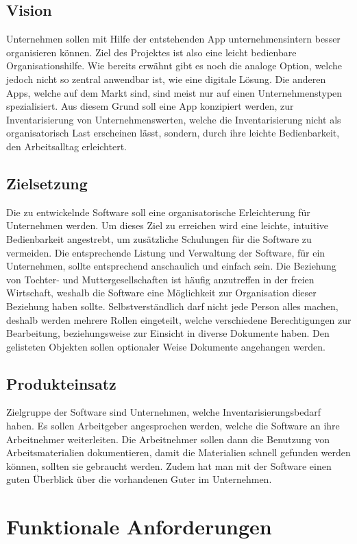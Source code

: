 \documentclass[11pt,a4paper]{report}
\begin{document}
\subsection{Vision}
Unternehmen sollen mit Hilfe der entstehenden App unternehmensintern besser organisieren können. Ziel des Projektes ist also eine leicht bedienbare Organisationshilfe. Wie bereits erwähnt gibt es noch die analoge Option, welche jedoch nicht so zentral anwendbar ist, wie eine digitale Lösung. Die anderen Apps, welche auf dem Markt sind, sind meist nur auf einen Unternehmenstypen spezialisiert. Aus diesem Grund soll eine App konzipiert werden, zur Inventarisierung von Unternehmenswerten, welche die Inventarisierung nicht als organisatorisch Last erscheinen lässt, sondern, durch ihre leichte Bedienbarkeit, den Arbeitsalltag erleichtert.
\subsection{Zielsetzung}
Die zu entwickelnde Software soll eine organisatorische Erleichterung für Unternehmen werden. Um dieses Ziel zu erreichen wird eine leichte, intuitive Bedienbarkeit angestrebt, um zusätzliche Schulungen für die Software zu vermeiden. Die entsprechende Listung und Verwaltung der Software, für ein Unternehmen, sollte entsprechend anschaulich und einfach sein. Die Beziehung von Tochter- und Muttergesellschaften ist häufig anzutreffen in der freien Wirtschaft, weshalb die Software eine Möglichkeit zur Organisation dieser Beziehung haben sollte. Selbstverständlich darf nicht jede Person alles machen, deshalb werden mehrere Rollen eingeteilt, welche verschiedene Berechtigungen zur Bearbeitung, beziehungsweise zur Einsicht in diverse Dokumente haben. Den gelisteten Objekten sollen optionaler Weise Dokumente angehangen werden.
\subsection{Produkteinsatz}
Zielgruppe der Software sind Unternehmen, welche Inventarisierungsbedarf haben. Es sollen Arbeitgeber angesprochen werden, welche die Software an ihre Arbeitnehmer weiterleiten. Die Arbeitnehmer sollen dann die Benutzung von Arbeitsmaterialien dokumentieren, damit die Materialien schnell gefunden werden können, sollten sie gebraucht werden. Zudem hat man mit der Software einen guten Überblick über die vorhandenen Guter im Unternehmen.
\newpage

\section{Funktionale Anforderungen}
\end{document}
